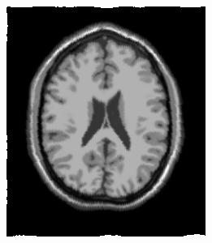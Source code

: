 \begin{figure}[H]
\begin{subfigure}[t]{0.23\textwidth}
	  \label{fig:sindist-image} 
	\end{subfigure} \\
	\begin{subfigure}[t]{0.25\textwidth}
	  \includegraphics[width=\textwidth]{figuras/resultSin.png}
	  \label{fig:sin-image-tps} 
	\end{subfigure}
	\begin{subfigure}[t]{0.25\textwidth}

\end{subfigure}
\end{figure}

